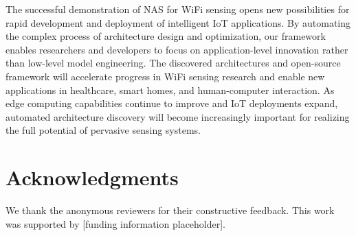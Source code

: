 \documentclass[journal]{IEEEtran}
\begin{document}
The successful demonstration of NAS for WiFi sensing opens new possibilities for rapid development and deployment of intelligent IoT applications. By automating the complex process of architecture design and optimization, our framework enables researchers and developers to focus on application-level innovation rather than low-level model engineering. The discovered architectures and open-source framework will accelerate progress in WiFi sensing research and enable new applications in healthcare, smart homes, and human-computer interaction. As edge computing capabilities continue to improve and IoT deployments expand, automated architecture discovery will become increasingly important for realizing the full potential of pervasive sensing systems.

\section*{Acknowledgments}

We thank the anonymous reviewers for their constructive feedback. This work was supported by [funding information placeholder].



\end{document}
